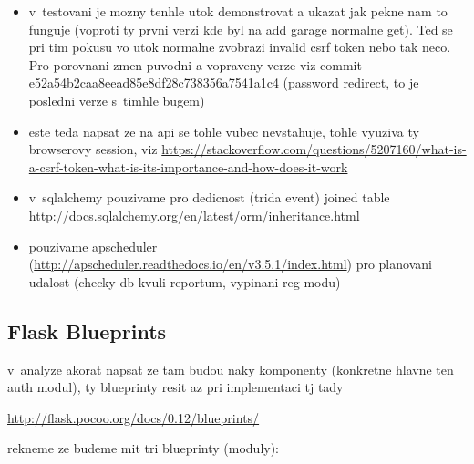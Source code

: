 \begin{itemize}
\item v~testovani je mozny tenhle utok demonstrovat a ukazat jak pekne nam to funguje (voproti ty prvni verzi kde byl na add garage normalne get). Ted se pri tim pokusu vo utok normalne zvobrazi invalid csrf token nebo tak neco. Pro porovnani zmen puvodni a vopraveny verze viz commit e52a54b2caa8eead85e8df28c738356a7541a1c4 (password redirect, to je posledni verze s~timhle bugem)

\item este teda napsat ze na api se tohle vubec nevstahuje, tohle vyuziva ty browserovy session, viz \url{https://stackoverflow.com/questions/5207160/what-is-a-csrf-token-what-is-its-importance-and-how-does-it-work}

\item v~sqlalchemy pouzivame pro dedicnost (trida event) joined table \url{http://docs.sqlalchemy.org/en/latest/orm/inheritance.html}

\item pouzivame apscheduler (\url{http://apscheduler.readthedocs.io/en/v3.5.1/index.html}) pro planovani udalost (checky db kvuli reportum, vypinani reg modu)

\end{itemize}

\subsection{Flask Blueprints}

v~analyze akorat napsat ze tam budou naky komponenty (konkretne hlavne ten auth modul), ty blueprinty resit az pri implementaci tj tady

\url{http://flask.pocoo.org/docs/0.12/blueprints/}

rekneme ze budeme mit tri blueprinty (moduly):

